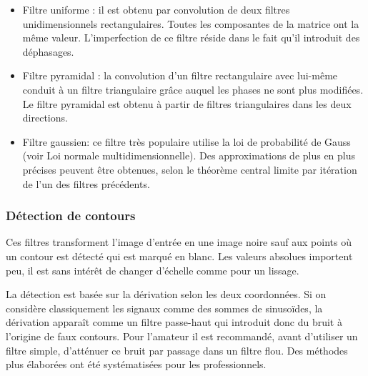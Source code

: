 \documentclass[11pt]{report}
\begin{document}
\begin{itemize}
\item Filtre uniforme : il est obtenu par convolution de deux filtres unidimensionnels
rectangulaires. Toutes les composantes de la matrice ont la même valeur.
L'imperfection de ce filtre réside dans le fait qu'il introduit des déphasages.
\item
Filtre pyramidal : la convolution d'un filtre rectangulaire avec lui-même conduit à un
filtre triangulaire grâce auquel les phases ne sont plus modifiées. Le filtre pyramidal
est obtenu à partir de filtres triangulaires dans les deux directions.
\item
Filtre gaussien: ce filtre très populaire utilise la loi de probabilité de Gauss (voir Loi
normale multidimensionnelle). Des approximations de plus en plus précises peuvent
être obtenues, selon le théorème central limite par itération de l'un des filtres
précédents.
\end{itemize}
\subsubsection{Détection de contours}
Ces filtres transforment l'image d'entrée en une image noire sauf aux points où un
contour est détecté qui est marqué en blanc. Les valeurs absolues importent peu, il est sans
intérêt de changer d'échelle comme pour un lissage.

La détection est basée sur la dérivation selon les deux coordonnées. Si on considère
classiquement les signaux comme des sommes de sinusoïdes, la dérivation apparaît comme
un filtre passe-haut qui introduit donc du bruit à l'origine de faux contours. Pour l'amateur il
est recommandé, avant d'utiliser un filtre simple, d'atténuer ce bruit par passage dans un
filtre flou. Des méthodes plus élaborées ont été systématisées pour les professionnels.
\end{document}
